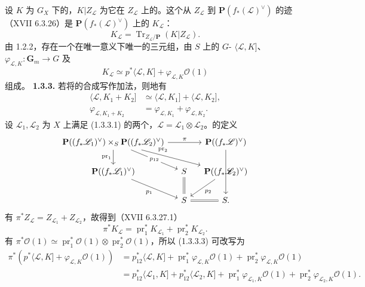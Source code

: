 设 $K$ 为 $G_X$ 下的，$K|Z_{\mathscr L}$ 为它在 $Z_{\mathscr L}$ 上的。这个从 $Z_{\mathscr L}$ 到 $\mathbf P(f_*(\mathscr L)^\vee)$ 的迹（XVII 6.3.26）是 $\mathbf P(f_*(\mathscr L)^\vee)$ 上的 $K_{\mathscr L}$：
\[K_{\mathscr L}=\operatorname{Tr}_{Z_{\mathscr L}/\mathbf P}(K|Z_{\mathscr L}).\]
由 1.2.2，存在一个在唯一意义下唯一的三元组，由 $S$ 上的 $G$- $\langle\mathscr L,K]$、 $\varphi_{\mathscr L,K}:\mathbf G_m\to G$ 及
\[K_{\mathscr L}\simeq p^*\langle\mathscr L,K]+\varphi_{\mathscr L,K}\mathscr O(1)\]
组成。
\textbf{1.3.3.} 若将的合成写作加法，则地有
\begin{align}\langle\mathscr L,K_1+K_2]&\simeq\langle\mathscr L,K_1]+\langle\mathscr L,K_2],\tag{1.3.3.1}\\\varphi_{\mathscr L,K_1+K_2}&=\varphi_{\mathscr L,K_1}+\varphi_{\mathscr L,K_2}.\tag{1.3.3.2}\end{align}
设 $\mathscr L_1,\mathscr L_2$ 为 $X$ 上满足 (1.3.3.1) 的两个，$\mathscr L=\mathscr L_1\otimes\mathscr L_2$。的定义
\[\begin{tikzcd}[column sep=small]\mathbf P((f_*\mathscr L_1)^\vee)\times_S\mathbf P((f_*\mathscr L_2)^\vee)\ar[rr,"\pi"]\ar[d,"\operatorname{pr}_1"']\ar[dr,"p_{12}" description]\ar[rrd,"\operatorname{pr}_2" near start]&&\mathbf P((f_*\mathscr L)^\vee)\ar[dd,"p"]\\\mathbf P((f_*\mathscr L_1)^\vee)\ar[dr,"p_1"']&S&\mathbf P((f_*\mathscr L_2)^\vee)\ar[dl,"p_2"]\\&S\ar[u,equal]\ar[r,equal]&S.\end{tikzcd}\]
有 $\pi^*Z_{\mathscr L}=Z_{\mathscr L_1}+Z_{\mathscr L_2}$，故得到（XVII 6.3.27.1）
\begin{equation}\pi^*K_{\mathscr L}=\operatorname{pr}_1^*K_{\mathscr L_1}+\operatorname{pr}_2^*K_{\mathscr L_2}.\tag{1.3.3.3}\end{equation}
有 $\pi^*\mathscr O(1)\simeq\operatorname{pr}_1^*\mathscr O(1)\otimes\operatorname{pr}_2^*\mathscr O(1)$，所以 (1.3.3.3) 可改写为
\[\begin{aligned}\pi^*(p^*\langle\mathscr L,K]+\varphi_{\mathscr L,K}\mathscr O(1))
&=p_{12}^*\langle\mathscr L,K]+\operatorname{pr}_1^*\varphi_{\mathscr L,K}\mathscr O(1)+\operatorname{pr}_2^*\varphi_{\mathscr L,K}\mathscr O(1)\\
&=p_{12}^*\langle\mathscr L_1,K]+p_{12}^*\langle\mathscr L_2,K]+\operatorname{pr}_1^*\varphi_{\mathscr L_1,K}\mathscr O(1)+\operatorname{pr}_2^*\varphi_{\mathscr L_2,K}\mathscr O(1).
\end{aligned}\]
